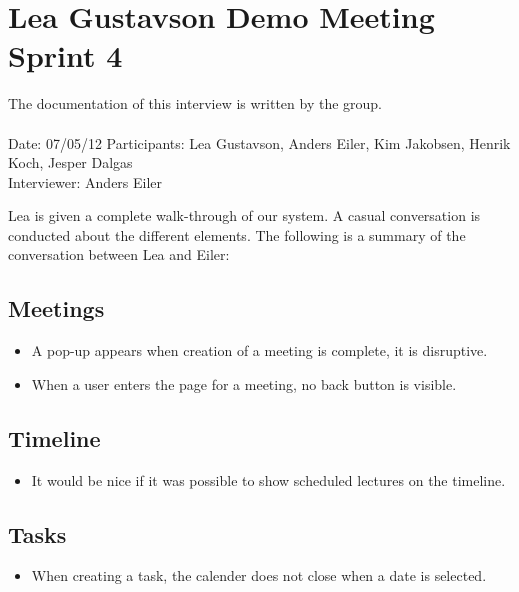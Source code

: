 
\section{Lea Gustavson Demo Meeting Sprint 4}
\label{app:leademo}
The documentation of this interview is written by the \timelinegroup{} group. \\ \ \\
Date: 07/05/12
Participants: Lea Gustavson, Anders Eiler, Kim Jakobsen, Henrik Koch, Jesper Dalgas \\
Interviewer: Anders Eiler

Lea is given a complete walk-through of our system.
A casual conversation is conducted about the different elements.
The following is a summary of the conversation between Lea and Eiler:

\subsection*{Meetings}
\begin{itemize}
	\item A pop-up appears when creation of a meeting is complete, it is disruptive.
	\item When a user enters the page for a meeting, no back button is visible.
\end{itemize}


\subsection*{Timeline}
\begin{itemize}
	\item It would be nice if it was possible to show scheduled lectures on the timeline.
\end{itemize}


\subsection*{Tasks}
\begin{itemize}
	\item When creating a task, the calender does not close when a date is selected.
\end{itemize}


